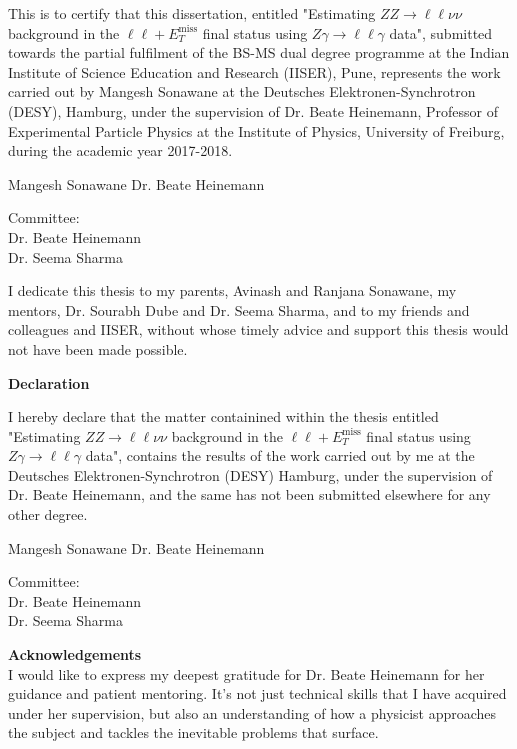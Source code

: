 \documentclass[12pt,a4paper,openright,twoside]{report}
\newcommand{\ZZ}{$ZZ\to \ell\ell\nu\nu$ }
\newcommand{\Zg}{$Z\gamma\to \ell\ell\gamma$ }
\newcommand{\llM}{$\ell\ell+E_T^{\mathrm{miss}}$ }
\newcommand\blankpage{%
    \null
    \thispagestyle{empty}%
    \addtocounter{page}{-1}%
    \newpage}
\begin{document}
\vspace{1cm}
\normalsize This is to certify that this dissertation, entitled "Estimating \ZZ background in the \llM final status using \Zg data", submitted towards the partial fulfilment of the BS-MS dual degree programme at the Indian Institute of Science Education and Research (IISER), Pune, represents the work carried out by Mangesh Sonawane at the Deutsches Elektronen-Synchrotron (DESY), Hamburg, under the supervision of Dr. Beate Heinemann, Professor of Experimental Particle Physics at the Institute of Physics, University of Freiburg, during the academic year 2017-2018.
\vfill
\begin{center}
Mangesh Sonawane\hspace{8cm}
Dr. Beate Heinemann
\end{center}
\vfill
Committee:\\
Dr. Beate Heinemann\\
Dr. Seema Sharma
\vfill
\vfill
\newpage
\blankpage
\newpage
{}
\vspace*{\fill}
\noindent I dedicate this thesis to my parents, Avinash and Ranjana Sonawane, my mentors, Dr. Sourabh Dube and Dr. Seema Sharma, and to my friends and colleagues and IISER, without whose timely advice and support this thesis would not have been made possible.
\vspace*{\fill}
\newpage
\blankpage
\newpage
\begin{center}
\Huge \textbf{Declaration\\}
\end{center}
\vspace{1cm}
\normalsize I hereby declare that the matter containined within the thesis entitled "Estimating \ZZ background in the \llM final status using \Zg data", contains the results of the work carried out by me at the Deutsches Elektronen-Synchrotron (DESY) Hamburg, under the supervision of Dr. Beate Heinemann, and the same has not been submitted elsewhere for any other degree.
\vfill
\begin{center}
Mangesh Sonawane\hspace{8cm}
Dr. Beate Heinemann
\end{center}
\vfill
Committee:\\
Dr. Beate Heinemann\\
Dr. Seema Sharma
\vfill
\vfill
\newpage
\blankpage
\newpage
{\Huge \textbf{Acknowledgements\vspace{2cm}\\}}
I would like to express my deepest gratitude for Dr. Beate Heinemann for her guidance and patient mentoring. It's not just technical skills that I have acquired under her supervision, but also an understanding of how a physicist approaches the subject and tackles the inevitable problems that surface.\vspace{1cm}
\end{document}
